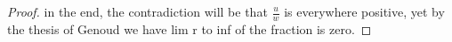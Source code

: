 \begin{proof}
{in the end, the contradiction will be that $\frac{u}{w}$ is everywhere positive,
yet by the thesis of Genoud we have lim r to inf of the fraction is zero.}



\end{proof}

